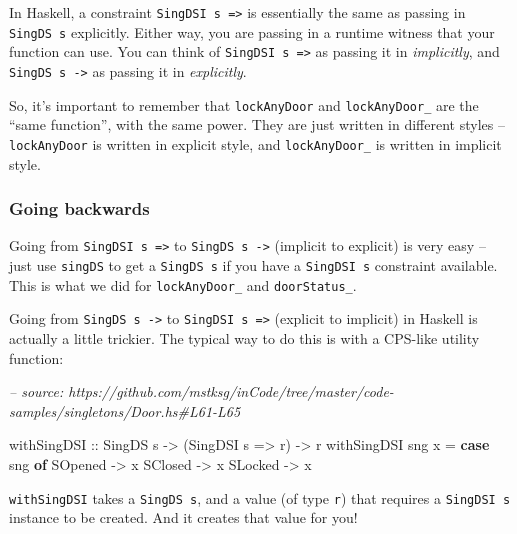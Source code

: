 \documentclass[]{article}
\newenvironment{Shaded}{}{}
\newcommand{\CommentTok}[1]{\textcolor[rgb]{0.38,0.63,0.69}{\textit{#1}}}
\newcommand{\DataTypeTok}[1]{\textcolor[rgb]{0.56,0.13,0.00}{#1}}
\newcommand{\FunctionTok}[1]{\textcolor[rgb]{0.02,0.16,0.49}{#1}}
\newcommand{\KeywordTok}[1]{\textcolor[rgb]{0.00,0.44,0.13}{\textbf{#1}}}
\newcommand{\NormalTok}[1]{#1}
\newcommand{\OtherTok}[1]{\textcolor[rgb]{0.00,0.44,0.13}{#1}}
\begin{document}
In Haskell, a constraint \texttt{SingDSI\ s\ =\textgreater{}} is essentially the
same as passing in \texttt{SingDS\ s} explicitly. Either way, you are passing in
a runtime witness that your function can use. You can think of
\texttt{SingDSI\ s\ =\textgreater{}} as passing it in \emph{implicitly}, and
\texttt{SingDS\ s\ -\textgreater{}} as passing it in \emph{explicitly}.

So, it's important to remember that \texttt{lockAnyDoor} and
\texttt{lockAnyDoor\_} are the ``same function'', with the same power. They are
just written in different styles -- \texttt{lockAnyDoor} is written in explicit
style, and \texttt{lockAnyDoor\_} is written in implicit style.

\hypertarget{going-backwards}{%
\subsubsection{Going backwards}\label{going-backwards}}

Going from \texttt{SingDSI\ s\ =\textgreater{}} to
\texttt{SingDS\ s\ -\textgreater{}} (implicit to explicit) is very easy -- just
use \texttt{singDS} to get a \texttt{SingDS\ s} if you have a
\texttt{SingDSI\ s} constraint available. This is what we did for
\texttt{lockAnyDoor\_} and \texttt{doorStatus\_}.

Going from \texttt{SingDS\ s\ -\textgreater{}} to
\texttt{SingDSI\ s\ =\textgreater{}} (explicit to implicit) in Haskell is
actually a little trickier. The typical way to do this is with a CPS-like
utility function:

\begin{Shaded}
\begin{Highlighting}[]
\CommentTok{-- source: https://github.com/mstksg/inCode/tree/master/code-samples/singletons/Door.hs#L61-L65}

\OtherTok{withSingDSI ::} \DataTypeTok{SingDS}\NormalTok{ s }\OtherTok{->}\NormalTok{ (}\DataTypeTok{SingDSI}\NormalTok{ s }\OtherTok{=>}\NormalTok{ r) }\OtherTok{->}\NormalTok{ r}
\NormalTok{withSingDSI sng x }\FunctionTok{=} \KeywordTok{case}\NormalTok{ sng }\KeywordTok{of}
    \DataTypeTok{SOpened} \OtherTok{->}\NormalTok{ x}
    \DataTypeTok{SClosed} \OtherTok{->}\NormalTok{ x}
    \DataTypeTok{SLocked} \OtherTok{->}\NormalTok{ x}
\end{Highlighting}
\end{Shaded}

\texttt{withSingDSI} takes a \texttt{SingDS\ s}, and a value (of type
\texttt{r}) that requires a \texttt{SingDSI\ s} instance to be created. And it
creates that value for you!
\end{document}
